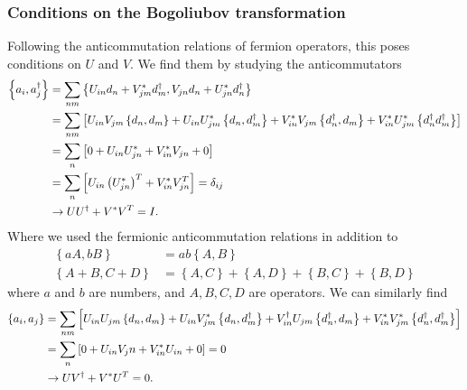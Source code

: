 \subsubsection{Conditions on the Bogoliubov transformation}
Following the anticommutation relations of fermion operators, this poses conditions on $U$ and $V$. We find them by studying the anticommutators
\begin{align}
    \left\{a_i, a_j^\dagger \right\} &= \sum_{nm} \left\{U_{in} d_n + V_{jm}^* d_m^\dagger, V_{jn} d_n + U_{jn}^* d_n^\dagger \right\}\\
    &= \sum_{nm} \left[ U_{in} V_{jm} \left\{d_n, d_m\right\} + U_{in} U_{jm}^* \left\{d_n, d_m^\dagger \right\} + V_{in}^* V_{jm} \left\{d_n^\dagger, d_m \right\} + V_{in}^* U_{jm}^* \left\{d_n^\dagger d_m^\dagger \right\}\right] \notag \\
    &= \sum_n \left[ 0 + U_{in} U_{jn}^* + V_{in}^* V_{jn} + 0\right]\\
    &= \sum_n \left[ U_{in} \left(U_{jn}^*\right)^T + V_{in}^* V_{jn}^T\right] = \delta_{ij}\\
    &\to U U^\dagger + V^* V^T = I.
\end{align}
Where we used the fermionic anticommutation relations in addition to 
\begin{align}
    \left\{a A, b B\right\} &= ab\left\{A,B\right\}\\
    \left\{A + B, C + D\right\} &= \left\{A, C\right\} + \left\{A, D\right\} + \left\{B, C\right\} + \left\{B, D\right\}
\end{align}
where $a$ and $b$ are numbers, and $A, B, C, D$ are operators. We can similarly find
\begin{align}
    \left\{a_i, a_j \right\} &= \sum_{nm} \left[ U_{in} U_{jm}\left\{ d_n, d_m \right\} + U_{in} V_{jm}^* \left\{d_n, d_m^\dagger \right\} + V_{in}^\dagger U_{jm} \left\{ d_n^\dagger, d_m\right\} + V_{in}^* V_{jm}^* \left\{d_n^\dagger, d_m^\dagger \right\}\right] \notag \\
    &= \sum_n \left[0 + U_{in}V_jn + V_{in}^* U_{in} + 0 \right] = 0\\
    &\to UV^\dagger + V^* U^T = 0.
\end{align}

